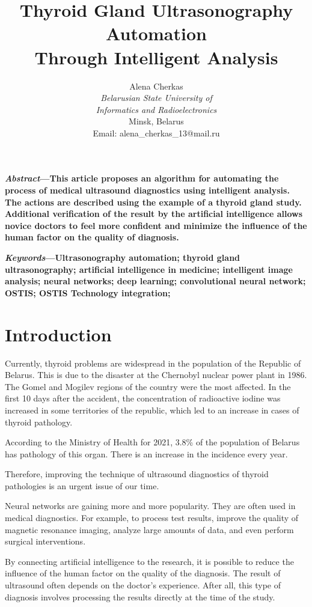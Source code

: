 \documentclass[10pt, twocolumn, a4paper]{article}
\title{\textbf{Thyroid Gland Ultrasonography Automation\\
Through Intelligent Analysis}}
\author{Alena Cherkas\\\textit{Belarusian State University of}\\ \textit{Informatics and Radioelectronics}\\Minsk, Belarus\\Email: alena\_cherkas\_13@mail.ru}
\date{}
\begin{document}
\maketitle

\begin{spacing}{0.7}\textbf{\textit{Abstract}—This article proposes an algorithm for automating the process of medical ultrasound diagnostics using intelligent analysis. The actions are described using the example of a thyroid gland study. Additional verification of the result by the artificial intelligence allows novice doctors to feel more confident and minimize the influence of the human factor on the quality of diagnosis.}

\textbf{\textit{Keywords}—Ultrasonography automation; thyroid gland ultrasonography; artificial intelligence in medicine; intelligent image analysis; neural networks; deep learning; convolutional neural network; OSTIS; OSTIS Technology integration;}
\end{spacing}

\section{Introduction}

Currently, thyroid problems are widespread in the population of the Republic of Belarus. This is due to the disaster at the Chernobyl nuclear power plant in 1986. The Gomel and Mogilev regions of the country were the most affected. In the first 10 days after the accident, the concentration of radioactive iodine was increased in some territories of the republic, which led to an increase in cases of thyroid pathology.

According to the Ministry of Health for 2021, 3.8\% of the population of Belarus has pathology of this organ. There is an increase in the incidence every year.

Therefore, improving the technique of ultrasound diagnostics of thyroid pathologies is an urgent issue of our time.

Neural networks are gaining more and more popularity. They are often used in medical diagnostics. For example, to process test results, improve the quality of magnetic resonance imaging, analyze large amounts of data, and even perform surgical interventions.

By connecting artificial intelligence to the research, it is possible to reduce the influence of the human factor on the quality of the diagnosis. The result of ultrasound often depends on the doctor’s experience. After all, this type of diagnosis involves processing the results directly at the time of the study.
\end{document}

